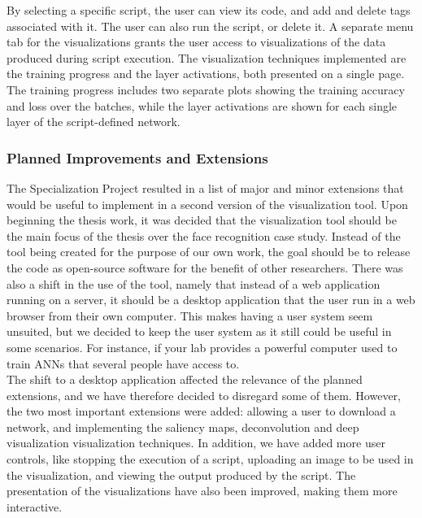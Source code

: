 \noindent By selecting a specific script, the user can view its code, and add and delete tags associated with it. The user can also run the script, or delete it. A separate menu tab for the visualizations grants the user access to visualizations of the data produced during script execution. The visualization techniques implemented are the training progress and the layer activations, both presented on a single page. The training progress includes two separate plots showing the training accuracy and loss over the batches, while the layer activations are shown for each single layer of the script-defined network.

\subsubsection{Planned Improvements and Extensions} %


The Specialization Project resulted in a list of major and minor extensions that would be useful to implement in a second version of the visualization tool. Upon beginning the thesis work, it was decided that the visualization tool should be the main focus of the thesis over the face recognition case study. Instead of the tool being created for the purpose of our own work, the goal should be to release the code as open-source software for the benefit of other researchers. There was also a shift in the use of the tool, namely that instead of a web application running on a server, it should be a desktop application that the user run in a web browser from their own computer. This makes having a user system seem unsuited, but we decided to keep the user system as it still could be useful in some scenarios. For instance, if your lab provides a powerful computer used to train ANNs that several people have access to. \\

The shift to a desktop application affected the relevance of the planned extensions, and we have therefore decided to disregard some of them. However, the two most important extensions were added: allowing a user to download a network, and implementing the saliency maps, deconvolution and deep visualization visualization techniques. In addition, we have added more user controls, like stopping the execution of a script, uploading an image to be used in the visualization, and viewing the output produced by the script. The presentation of the visualizations have also been improved, making them more interactive.

